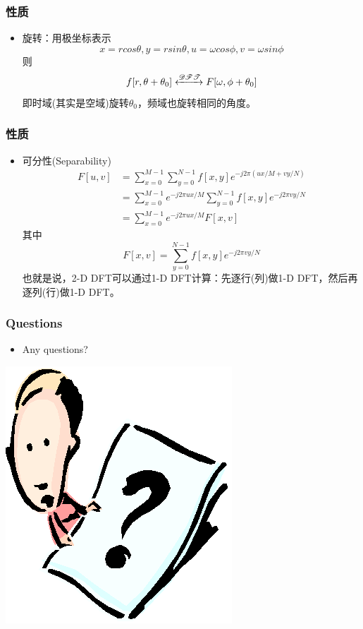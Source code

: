 \documentclass[CJKutf8,dvipsnames,table]{beamer}
\newif\ifxetexorluatex %
\begin{document}
\begin{CJK*}{UTF8}{song}
  \begin{frame}
    \frametitle{性质}
    \begin{itemize}
    \item 旋转：用极坐标表示    
    \[
    	x=rcos\theta, y=rsin\theta, u = \omega cos\phi, v=\omega sin \phi
    \]
    则
    \[
    	f[r, \theta+\theta_0] \xleftrightarrow{\mathscr{DFT}} F[\omega, \phi+\theta_0]
    \]
    即时域(其实是空域)旋转$\theta_0$，频域也旋转相同的角度。
    \end{itemize}
  \end{frame}  
  
  \begin{frame}
    \frametitle{性质}
    \begin{itemize}
    \item 可分性(Separability)    
    \begin{align*}
    	F[u, v] & = \sum_{x=0}^{M-1} \sum_{y=0}^{N-1} f[x, y] e^{-j2\pi (ux/M+vy/N)} \\
	            & = \sum_{x=0}^{M-1} e^{-j2\pi ux/M} \sum_{y=0}^{N-1} f[x, y] e^{-j2\pi vy/N} \\
	            & = \sum_{x=0}^{M-1} e^{-j2\pi ux/M} F[x, v]
    \end{align*}
    其中
    \[
	    F[x, v] = \sum_{y=0}^{N-1} f[x, y] e^{-j2\pi vy/N}
    \]
    也就是说，{\color{red}2-D DFT可以通过1-D DFT计算：先逐行(列)做1-D DFT，然后再逐列(行)做1-D DFT}。    
    \end{itemize}
  \end{frame}  
    
  \begin{frame}
    \frametitle{Questions}
    \begin{itemize}
    \item Any questions?
    \end{itemize}
    \begin{center}
      \includegraphics[scale=.5]{question}
    \end{center}
  \end{frame}  
  
\ifxetexorluatex\else
\end{CJK*}
\fi
\end{document}
